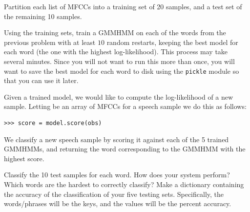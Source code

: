 \begin{problem}
Partition each list of MFCCs into a training set of 20 samples, and a test set of the remaining 10 samples.

Using the training sets, train a GMMHMM on each of the words from the previous problem with at least $10$ random restarts, keeping the best model for each word (the one with the highest log-likelihood).
This process may take several minutes.  Since you will not want to run this more than once, you will want to save the best model for each word to disk using the {\tt pickle} module so that you can use it later.
\end{problem}

Given a trained model, we would like to compute the log-likelihood of a new sample.
Letting  be an array of MFCCs for a speech sample we do this as follows:
\begin{lstlisting}
>>> score = model.score(obs)
\end{lstlisting}
We classify a new speech sample by scoring it against each of the 5 trained GMMHMMs, and returning the word corresponding to the GMMHMM with the highest score.
\begin{problem}
Classify the 10 test samples for each word. 
How does your system perform? Which words are the hardest to correctly classify?
Make a dictionary containing the accuracy of the classification of your five testing sets.  Specifically, the words/phrases will be the keys, and the values will be the percent accuracy. 
\end{problem}
























